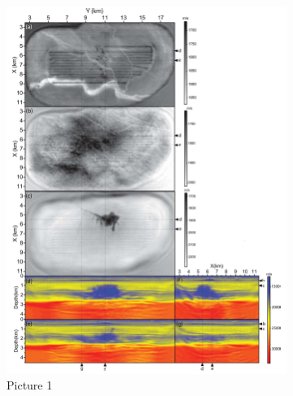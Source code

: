 \begin{figure}
\centering 
  \begin{subfigure}[b]{0.4\textwidth}
    \includegraphics[width=\textwidth]{images/sim2.png}
    \caption{Picture 1}
    \label{sim2}
  \end{subfigure}
  \begin{subfigure}[b]{0.4\textwidth}

\end{subfigure}
\end{figure}
